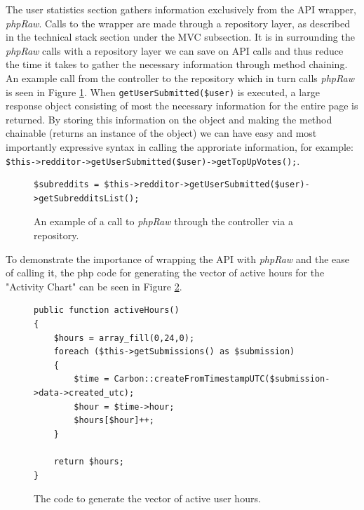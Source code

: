 \documentclass[msc,oneside]{ubcthesis}%
\begin{document}
The user statistics section gathers information exclusively from the API wrapper, \textit{phpRaw}. Calls to the wrapper are made through a repository layer, as described in the technical stack section under the MVC subsection. It is in surrounding the \textit{phpRaw} calls with a repository layer we can save on API calls and thus reduce the time it takes to gather the necessary information through method chaining. An example call from the controller to the repository which in turn calls \textit{phpRaw} is seen in Figure \ref{fig:repotophpraw}. When \texttt{getUserSubmitted(\$user)} is executed, a large response object consisting of most the necessary information for the entire page is returned. By storing this information on the object and making the method chainable (returns an instance of the object) we can have easy and most importantly expressive syntax in calling the approriate information, for example:\\ \texttt{\$this->redditor->getUserSubmitted(\$user)->getTopUpVotes();}.
\begin{figure}[H]
\begin{center}
\begin{lstlisting}
$subreddits = $this->redditor->getUserSubmitted($user)->getSubredditsList();
\end{lstlisting}
\end{center}
\caption[Example of call to phpRaw through controller via repository]{
An example of a call to \textit{phpRaw} through the controller via a repository.}
\label{fig:repotophpraw}
\end{figure}

To demonstrate the importance of wrapping the API with \textit{phpRaw} and the ease of calling it, the php code for generating the vector of active hours for the "Activity Chart" can be seen in Figure \ref{fig:activehours}.

\begin{figure}[H]
\begin{center}
\begin{lstlisting}
public function activeHours()
{
	$hours = array_fill(0,24,0);
	foreach ($this->getSubmissions() as $submission)
	{
		$time = Carbon::createFromTimestampUTC($submission->data->created_utc);
		$hour = $time->hour;
		$hours[$hour]++;
	}

	return $hours;
}
\end{lstlisting}
\end{center}
\caption[Code to generate vector of active hours]{
The code to generate the vector of active user hours.}
\label{fig:activehours}
\end{figure}
\end{document}
